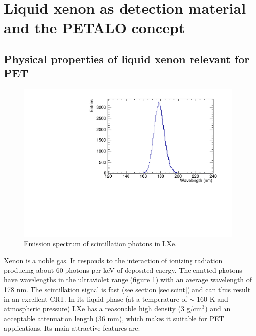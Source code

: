 \documentclass[review]{elsarticle}
\begin{document}
%


\section{Liquid xenon as detection material and the PETALO concept}
\label{sec.LXe}


\subsection*{Physical properties of liquid xenon relevant for PET}


\begin{figure}[!bhtp]
	\centering
	\includegraphics[scale=0.5]{../img/ScintillationSpectrumLXe.pdf}
	\caption{\label{fig.spectrumLXe} Emission spectrum of scintillation photons in LXe.}
\end{figure}

Xenon is a noble gas. It responds to the interaction of ionizing radiation producing about 60 photons per keV of deposited energy. The emitted photons have wavelengths in the ultraviolet range 
(figure \ref{fig.spectrumLXe}) with an average wavelength of 178 nm. The scintillation signal is fast 
(see section \ref{sec.scint}) and can thus result in an excellent CRT.  In its liquid phase (at a temperature of $\sim$ 160 K and atmospheric pressure) LXe has a reasonable high density (3 g/cm$^3$) and an acceptable attenuation length (36 mm), which makes it suitable for PET applications. Its main attractive features are:
\end{document}
